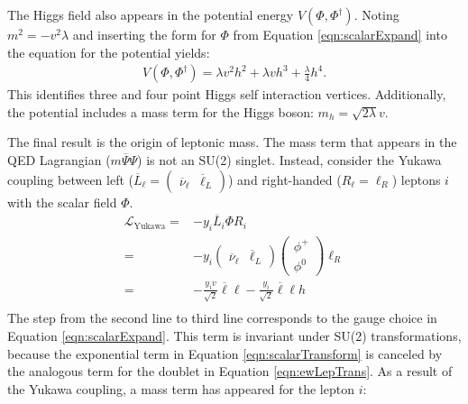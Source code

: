 The Higgs field also appears in the potential energy $V(\Phi,\Phi^\dagger)$.
Noting $m^2=-v^2\lambda$ and inserting the form for $\Phi$ from Equation \ref{eqn:scalarExpand} into the equation for the potential yields:
\begin{equation}\begin{split}\label{eqn:higgsPotential}
    V(\Phi,\Phi^\dagger)=\lambda v^2h^2+\lambda vh^3+\frac{\lambda}{4}h^4.
\end{split}\end{equation}
This identifies three and four point Higgs self interaction vertices.
Additionally, the potential includes a mass term for the Higgs boson: $m_h=\sqrt{2\lambda}v$.

The final result is the origin of leptonic mass.
The mass term that appears in the QED Lagrangian ($m\overline{\Psi}\Psi$) is not an SU(2) singlet.
Instead, consider the Yukawa coupling between left ($\overline{L}_\ell=\begin{pmatrix}\overline{\nu}_\ell&\overline{\ell}_L\end{pmatrix}$) and right-handed ($R_\ell=\ell_R$) leptons $i$ with the scalar field $\Phi$.
\begin{equation}\begin{split}\label{eqn:leptonYukawaLagrangian}
        \mathcal{L}_{\text{Yukawa}}=&-y_i \overline{L}_i\Phi R_i \\
        =&-y_i\begin{pmatrix}\overline{\nu}_\ell&\overline{\ell}_L\end{pmatrix}\begin{pmatrix}\phi^+\\\phi^0\end{pmatrix}\ell_R \\
        =&-\frac{y_iv}{\sqrt{2}}\overline{\ell}\ell-\frac{y_i}{\sqrt{2}}\overline{\ell}\ell h \\
\end{split}\end{equation}
The step from the second line to third line corresponds to the gauge choice in Equation \ref{eqn:scalarExpand}.
This term is invariant under SU(2) transformations, because the exponential term in Equation \ref{eqn:scalarTransform} is canceled by the analogous term for the doublet in Equation \ref{eqn:ewLepTrans}.
As a result of the Yukawa coupling, a mass term has appeared for the lepton $i$:
